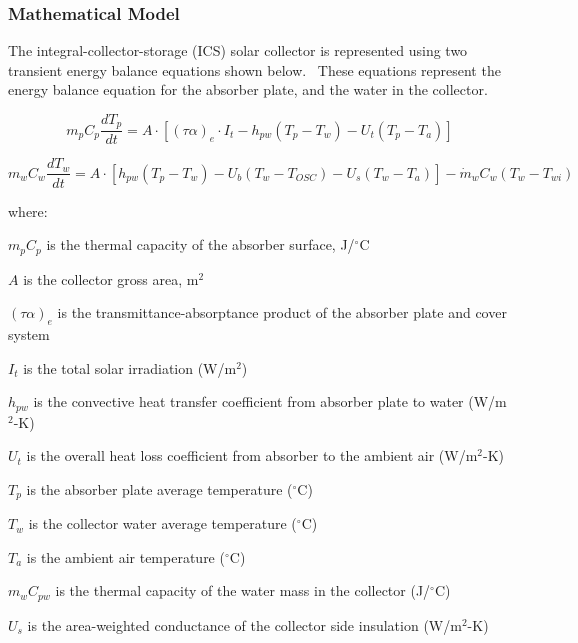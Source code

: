 \subsubsection{Mathematical Model}\label{mathematical-model}

The integral-collector-storage (ICS) solar collector is represented using two transient energy balance equations shown below.~ These equations represent the energy balance equation for the absorber plate, and the water in the collector.

\begin{equation}
{m_p}{C_p}\frac{{d{T_p}}}{{dt}} = A \cdot \left[ {{{\left( {\tau \alpha } \right)}_e} \cdot {I_t} - {h_{pw}}\left( {{T_p} - {T_w}} \right) - {U_t}\left( {{T_p} - {T_a}} \right)} \right]
\end{equation}

\begin{equation}
{m_w}{C_w}\frac{{d{T_w}}}{{dt}} = A \cdot \left[ {{h_{pw}}\left( {{T_p} - {T_w}} \right) - {U_b}\left( {{T_w} - {T_{OSC}}} \right) - {U_s}\left( {{T_w} - {T_a}} \right)} \right] - {\dot m_w}{C_w}\left( {{T_w} - {T_{wi}}} \right)
\end{equation}

where:

\(m_{p} C_{p}\) is the thermal capacity of the absorber surface, J/\(^{\circ}\)C

\(A\) is the collector gross area, m\(^{2}\)

\({(\tau \alpha)}_{e}\) is the transmittance-absorptance product of the absorber plate and cover system

\(I_{t}\) is the total solar irradiation (W/m\(^{2}\))

\(h_{pw}\) is the convective heat transfer coefficient from absorber plate to water (W/m\(^2\)-K)

\(U_{t}\) is the overall heat loss coefficient from absorber to the ambient air (W/m\(^2\)-K)

\(T_{p}\) is the absorber plate average temperature (\(^{\circ}\)C)

\(T_{w}\) is the collector water average temperature (\(^{\circ}\)C)

\(T_{a}\) is the ambient air temperature (\(^{\circ}\)C)

\(m_{w} C_{pw}\) is the thermal capacity of the water mass in the collector (J/\(^{\circ}\)C)

\(U_{s}\) is the area-weighted conductance of the collector side insulation (W/m\(^{2}\)-K)

